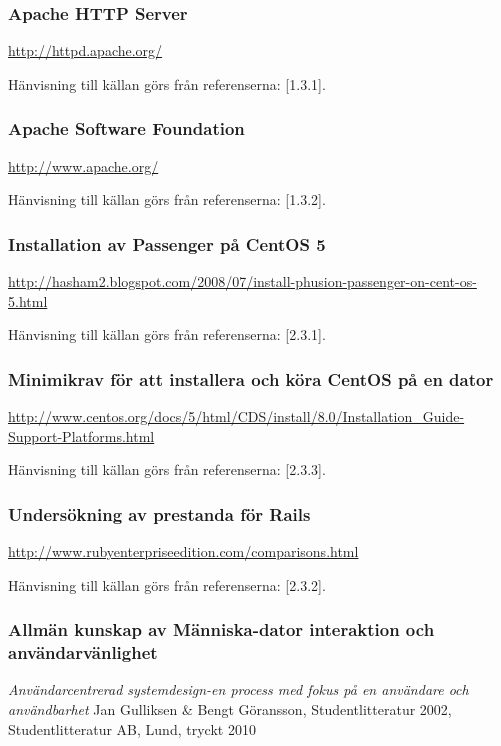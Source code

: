 \documentclass[a4paper, twoside, 11pt, titlepage]{article}
\begin{document}
	\subsubsection{Apache HTTP Server}


		\url{http://httpd.apache.org/}

		Hänvisning till källan görs från referenserna: [1.3.1].

	\subsubsection{Apache Software Foundation}


		\url{http://www.apache.org/}

		Hänvisning till källan görs från referenserna: [1.3.2].

	\subsubsection{Installation av Passenger på CentOS 5}


		\url{http://hasham2.blogspot.com/2008/07/install-phusion-passenger-on-cent-os-5.html}

		Hänvisning till källan görs från referenserna: [2.3.1].

	\subsubsection{Minimikrav för att installera och köra CentOS på en dator}


		\url{http://www.centos.org/docs/5/html/CDS/install/8.0/Installation\_Guide-Support-Platforms.html}

		Hänvisning till källan görs från referenserna: [2.3.3].

	\subsubsection{Undersökning av prestanda för Rails}


		\url{http://www.rubyenterpriseedition.com/comparisons.html}

		Hänvisning till källan görs från referenserna: [2.3.2].

	\subsubsection{Allmän kunskap av Människa-dator interaktion och användarvänlighet}


		\emph{Användarcentrerad systemdesign-en process med fokus på en användare och användbarhet} Jan Gulliksen \& Bengt Göransson, Studentlitteratur 2002, Studentlitteratur AB, Lund, tryckt 2010
\end{document}

